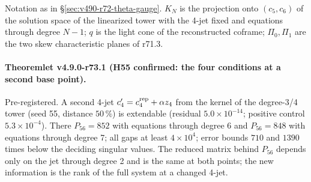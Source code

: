 Notation as in \S\ref{sec:v490-r72-theta-gauge}.  \(K_N\) is the projection onto \((c_5,c_6)\) of the solution space of the
linearized tower with the 4-jet fixed and equations through degree \(N-1\); \(q\) is the light cone of the reconstructed
coframe; \(\Pi_0,\Pi_1\) are the two skew characteristic planes of r71.3.

\paragraph{Theoremlet v4.9.0-r73.1 (H55 confirmed: the four conditions at a second base point).}
Pre-registered.  A second 4-jet \(c_4'=c_4^{\rm rep}+\alpha z_4\) from the kernel of the degree-3/4 tower (seed 55, distance
\(50\,\%\)) is extendable (residual \(5.0\times10^{-14}\); positive control \(5.3\times10^{-4}\)).  There
\(P_{56}=852\) with equations through degree 6 and \(P_{56}=848\) with equations through degree 7; all gaps at least
\(4\times10^4\); error bounds \(710\) and \(1390\) times below the deciding singular values.  The reduced matrix behind
\(P_{56}\) depends only on the jet through degree 2 and is the same at both points; the new information is the rank of the full
system at a changed 4-jet.

